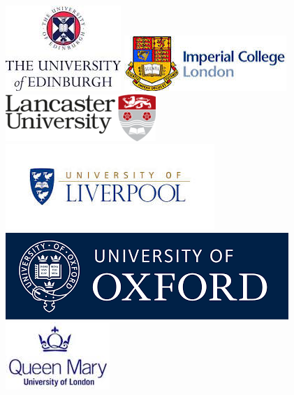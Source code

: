 \documentclass[11pt]{article}
\begin{document}
\begin{figure}[htb]
\begin{center}
\includegraphics[scale=.4]{figs/edinburgh.jpg}
\vspace{.2cm}
\includegraphics[scale=0.4]{figs/ic.jpg}
\vspace{.2cm}
\includegraphics[scale=.4]{figs/lancaster.png}
\vspace{.2cm}
\includegraphics[scale=.3]{figs/liverpool.jpg}
\vspace{.2cm}
\includegraphics[scale=0.15]{figs/oxford.png}
\vspace{.2cm}\\
\includegraphics[scale=.4]{figs/qmul.jpg}
\vspace{.2cm}

\end{center}
\end{figure}
\end{document}
